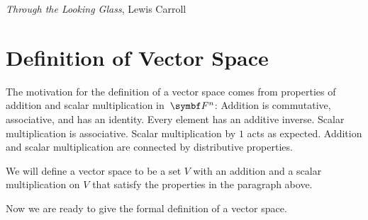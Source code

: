 {\textit{Through the Looking Glass}, Lewis Carroll}

\section{Definition of Vector Space} \label{1DefVS}

The motivation for the definition of a vector space comes from
properties of addition and scalar multiplication in~$\F{n}$:
Addition is commutative, associative, and has an
identity.  Every element has an additive inverse.  Scalar
multiplication is associative. Scalar multiplication by $1$ acts as
expected. Addition and scalar multiplication are connected by distributive  properties.

We will define a vector space to be a set $V$
with an addition and a scalar multiplication on $V$ that satisfy the properties
in the paragraph above.


Now we are ready to give the formal definition of a vector space.

\vspace{-.05in}

